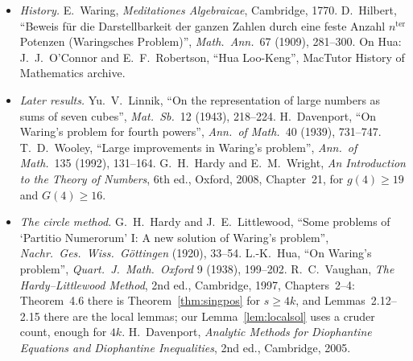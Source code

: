 \begin{itemize}
\item \emph{History.} E.~Waring, \emph{Meditationes Algebraicae}, Cambridge, 1770. D.~Hilbert, ``Beweis für die Darstellbarkeit der ganzen Zahlen durch eine feste Anzahl $n^{\text{ter}}$ Potenzen (Waringsches Problem)'', \emph{Math.\ Ann.}\ 67 (1909), 281--300. On Hua: J.~J.~O'Connor and E.~F.~Robertson, ``Hua Loo-Keng'', MacTutor History of Mathematics archive.
\item \emph{Later results.} Yu.~V.~Linnik, ``On the representation of large numbers as sums of seven cubes'', \emph{Mat.\ Sb.}\ 12 (1943), 218--224. H.~Davenport, ``On Waring's problem for fourth powers'', \emph{Ann.\ of Math.}\ 40 (1939), 731--747. T.~D.~Wooley, ``Large improvements in Waring's problem'', \emph{Ann.\ of Math.}\ 135 (1992), 131--164. G.~H.~Hardy and E.~M.~Wright, \emph{An Introduction to the Theory of Numbers}, 6th ed., Oxford, 2008, Chapter~21, for $g(4)\ge19$ and $G(4)\ge16$.
\item \emph{The circle method.} G.~H.~Hardy and J.~E.~Littlewood, ``Some problems of `Partitio Numerorum' I: A new solution of Waring's problem'', \emph{Nachr.\ Ges.\ Wiss.\ Göttingen} (1920), 33--54. L.-K.~Hua, ``On Waring's problem'', \emph{Quart.\ J.\ Math.\ Oxford} 9 (1938), 199--202. R.~C.~Vaughan, \emph{The Hardy--Littlewood Method}, 2nd ed., Cambridge, 1997, Chapters~2--4: Theorem~4.6 there is Theorem~\ref{thm:singpos} for $s\ge4k$, and Lemmas~2.12--2.15 there are the local lemmas; our Lemma~\ref{lem:localsol} uses a cruder count, enough for $4k$. H.~Davenport, \emph{Analytic Methods for Diophantine Equations and Diophantine Inequalities}, 2nd ed., Cambridge, 2005.
\end{itemize}
